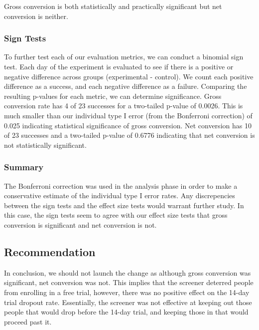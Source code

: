 \documentclass[paper=a4, fontsize=11pt]{scrartcl} %
\numberwithin{equation}{section} %
\numberwithin{figure}{section} %
\numberwithin{table}{section} %
\begin{document}
Gross conversion is both statistically and practically significant but net conversion is neither. \newline


\subsubsection{Sign Tests}

To further test each of our evaluation metrics, we can conduct a binomial sign test.  Each day of the experiment is evaluated to see if there is a positive or negative difference across groups (experimental - control).  We count each positive difference as a success, and each negative difference as a failure.  Comparing the resulting p-values for each metric, we can determine significance.
Gross conversion rate has 4 of 23 successes for a two-tailed p-value of 0.0026.  This is much smaller than our individual type I error (from the Bonferroni correction) of 0.025 indicating statistical significance of gross conversion.  Net conversion has 10 of 23 successes and a two-tailed p-value of 0.6776 indicating that net conversion is not statistically significant.


\subsubsection{Summary}

The Bonferroni correction was used in the analysis phase in order to make a conservative estimate of the individual type I error rates.  Any discrepencies between the sign tests and the effect size tests would warrant further study.  In this case, the sign tests seem to agree with our effect size tests that gross conversion is significant and net conversion is not.


\subsection{Recommendation}

In conclusion, we should not launch the change as although gross conversion was significant, net conversion was not.  This implies that the screener deterred people from enrolling in a free trial, however, there was no positive effect on the 14-day trial dropout rate.  Essentially, the screener was not effective at keeping out those people that would drop before the 14-day trial, and keeping those in that would proceed past it. \newline
\end{document}
